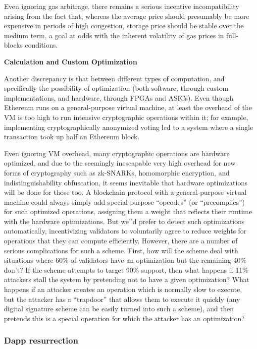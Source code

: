 \documentclass[12pt, final]{article}
\begin{document}
Even ignoring gas arbitrage, there remains a serious incentive incompatibility arising from the fact that, whereas the average price should presumably be more expensive in periods of high congestion, storage price should be stable over the medium term, a goal at odds with the inherent volatility of gas prices in full-blocks conditions. 

\textbf{Calculation and Custom Optimization}

Another discrepancy is that between different types of computation, and specifically the possibility of optimization (both software, through custom implementations, and hardware, through FPGAs and ASICs). Even though Ethereum runs on a general-purpose virtual machine, at least the overhead of the VM is too high to run intensive cryptographic operations within it; for example, implementing cryptographically anonymized voting led to a system where a single transaction took up half an Ethereum block. \cite{fc17ai}

Even ignoring VM overhead, many cryptographic operations are hardware optimized, and due to the seemingly inescapable very high overhead for new forms of cryptography such as zk-SNARKs, homomorphic encryption, and indistinguishability obfuscation, it seems inevitable that hardware optimizations will be done for those too. A blockchain protocol with a general-purpose virtual machine could always simply add special-purpose ``opcodes'' (or ``precompiles'') for such optimized operations, assigning them a weight that reflects their runtime with the hardware optimizations. But we'’d prefer to detect such optimizations automatically, incentivizing validators to voluntarily agree to reduce weights for operations that they can compute efficiently. However, there are a number of serious complications for such a scheme. First, how will the scheme deal with situations where 60\% of validators have an optimization but the remaining 40\% don't? If the scheme attempts to target 90\% support, then what happens if 11\% attackers stall the system by pretending not to have a given optimization? What happens if an attacker creates an operation which is normally slow to execute, but the attacker has a ``trapdoor'' that allows them to execute it quickly (any digital signature scheme can be easily turned into such a scheme), and then pretends this is a special operation for which the attacker has an optimization?


\subsubsection{Dapp resurrection}
\end{document}
